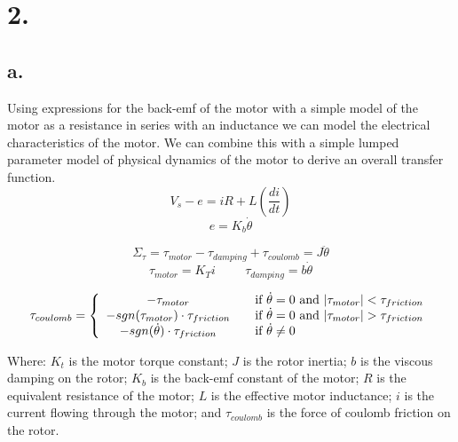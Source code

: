 \documentclass{article}
\theoremstyle{plain}
\theoremstyle{definition}
\theoremstyle{remark}
\begin{document}
\section*{2.}

\subsection*{a.}

Using expressions for the back-emf of the motor with a simple model of the motor as a resistance in series with an inductance we can model the electrical characteristics of the motor.  We can combine this with a simple lumped parameter model of physical dynamics of the motor to derive an overall transfer function.  
$$V_{s} - e = iR + L\left(\frac{di}{dt}\right) $$
$$ e = K_{b} \dot{\theta} $$

$$ \Sigma_{\tau} = \tau_{motor} - \tau_{damping} + \tau_{coulomb} = J \ddot{\theta}$$
$$ \tau_{motor} = K_{T}i \hspace{1cm} \tau_{damping} = b \dot{\theta}$$

\[
  \tau_{coulomb} = \left\{
  \begin{array}{c l}
	 - \tau_{motor} & \quad \text{if } \dot{\theta} = 0 \text{ and } |\tau_{motor}| < \tau_{friction} \\
	- sgn(\tau_{motor}) \cdot \tau_{friction} & \quad \text{if } \dot{\theta} = 0 \text{ and } |\tau_{motor}| > \tau_{friction} \\
	- sgn(\dot{\theta}) \cdot \tau_{friction} & \quad \text{if } \dot{\theta} \neq 0 \\
  \end{array} \right.
\]

Where: $K_{t}$ is the motor torque constant; $J$ is the rotor inertia; $b$ is the viscous damping on the rotor; $K_{b}$ is the back-emf constant of the motor; $R$ is the equivalent resistance of the motor; $L$ is the effective motor inductance; $i$ is the current flowing through the motor; and $\tau_{coulomb}$ is the force of coulomb friction on the rotor. \\
\end{document}
